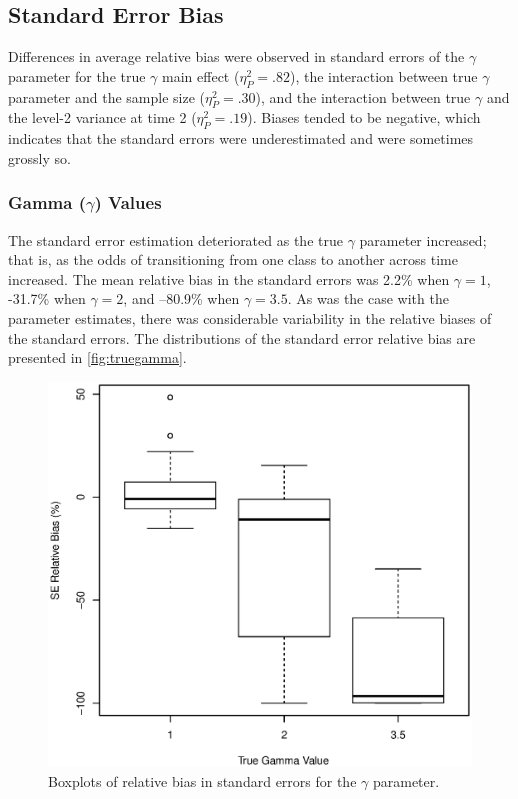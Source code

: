 \documentclass[man]{apa6}
\begin{document}
\subsection*{Standard Error Bias}
Differences in average relative bias were observed in standard errors of the $\gamma$ parameter for the true $\gamma$ main effect ($\eta_P^2 = .82$), the interaction between true $\gamma$ parameter and the sample size ($\eta_P^2 = .30$), and the interaction between true $\gamma$ and the level-2 variance at time 2 ($\eta_P^2 = .19$). Biases tended to be negative, which indicates that the standard errors were underestimated and were sometimes grossly so. 

\subsubsection*{Gamma ($\gamma$) Values}
The standard error estimation deteriorated as the true $\gamma$ parameter increased; that is, as the odds of transitioning from one class to another across time increased. The mean relative bias in the standard errors was 2.2\% when $\gamma=1$, -31.7\% when $\gamma=2$, and --80.9\% when $\gamma=3.5$. As was the case with the parameter estimates, there was considerable variability in the relative biases of the standard errors. The distributions of the standard error relative bias are presented in \autoref{fig:truegamma}.

\begin{figure}[ht]
\centering
\includegraphics[scale=1]{truegamma.eps}
\caption{Boxplots of relative bias in standard errors for the $\gamma$ parameter.}\label{fig:truegamma}
\end{figure}
\end{document}
